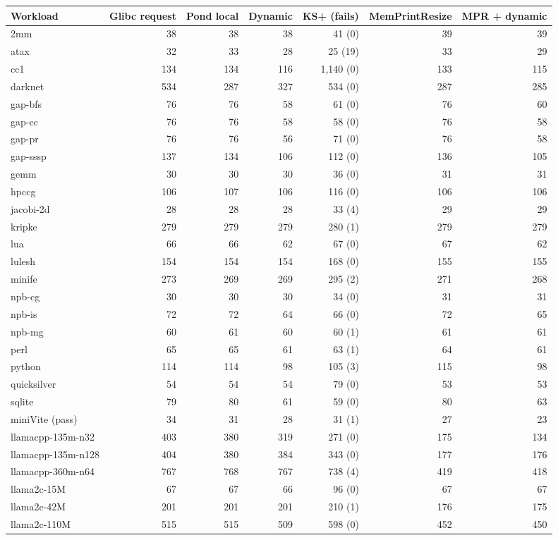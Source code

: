 \begin{tabular}{lrrrrrr}
\toprule
Workload & Glibc request & Pond local & Dynamic & KS+ (fails) & MemPrintResize & MPR + dynamic \\
\midrule
2mm & 38 & 38 & 38 & 41 (0) & 39 & 39 \\
atax & 32 & 33 & 28 & 25 (19) & 33 & 29 \\
cc1 & 134 & 134 & 116 & 1{,}140 (0) & 133 & 115 \\
darknet & 534 & 287 & 327 & 534 (0) & 287 & 285 \\
gap-bfs & 76 & 76 & 58 & 61 (0) & 76 & 60 \\
gap-cc & 76 & 76 & 58 & 58 (0) & 76 & 58 \\
gap-pr & 76 & 76 & 56 & 71 (0) & 76 & 58 \\
gap-sssp & 137 & 134 & 106 & 112 (0) & 136 & 105 \\
gemm & 30 & 30 & 30 & 36 (0) & 31 & 31 \\
hpccg & 106 & 107 & 106 & 116 (0) & 106 & 106 \\
jacobi-2d & 28 & 28 & 28 & 33 (4) & 29 & 29 \\
kripke & 279 & 279 & 279 & 280 (1) & 279 & 279 \\
lua & 66 & 66 & 62 & 67 (0) & 67 & 62 \\
lulesh & 154 & 154 & 154 & 168 (0) & 155 & 155 \\
minife & 273 & 269 & 269 & 295 (2) & 271 & 268 \\
npb-cg & 30 & 30 & 30 & 34 (0) & 31 & 31 \\
npb-is & 72 & 72 & 64 & 66 (0) & 72 & 65 \\
npb-mg & 60 & 61 & 60 & 60 (1) & 61 & 61 \\
perl & 65 & 65 & 61 & 63 (1) & 64 & 61 \\
python & 114 & 114 & 98 & 105 (3) & 115 & 98 \\
quicksilver & 54 & 54 & 54 & 79 (0) & 53 & 53 \\
sqlite & 79 & 80 & 61 & 59 (0) & 80 & 63 \\
miniVite (pass) & 34 & 31 & 28 & 31 (1) & 27 & 23 \\
llamacpp-135m-n32 & 403 & 380 & 319 & 271 (0) & 175 & 134 \\
llamacpp-135m-n128 & 404 & 380 & 384 & 343 (0) & 177 & 176 \\
llamacpp-360m-n64 & 767 & 768 & 767 & 738 (4) & 419 & 418 \\
llama2c-15M & 67 & 67 & 66 & 96 (0) & 67 & 67 \\
llama2c-42M & 201 & 201 & 201 & 210 (1) & 176 & 175 \\
llama2c-110M & 515 & 515 & 509 & 598 (0) & 452 & 450 \\
\bottomrule
\end{tabular}
